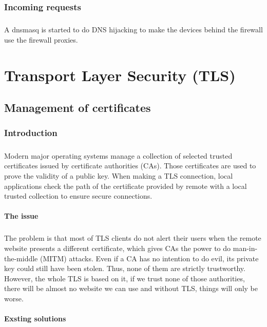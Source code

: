 \documentclass[mscthesis]{usiinfthesis}
\begin{document}
\subsection{Incoming requests}
\paragraph{}
A dnsmasq is started to do DNS hijacking to make the devices behind the firewall use the firewall proxies.

\chapter{Transport Layer Security (TLS)}\label{cha:tls}

\section{Management of certificates}

\subsection{Introduction}
\paragraph{}
Modern major operating systems manage a collection of selected trusted certificates issued by certificate authorities (CAs). Those certificates are used to prove the validity of a public key. When making a TLS connection, local applications check the path of the certificate provided by remote with a local trusted collection to ensure secure connections.
\subsubsection{The issue}
\paragraph{}
The problem is that most of TLS clients do not alert their users when the remote website presents a different certificate, which gives CAs the power to do man-in-the-middle (MITM) attacks. Even if a CA has no intention to do evil, its private key could still have been stolen. Thus, none of them are strictly trustworthy. However, the whole TLS is based on it, if we trust none of those authorities, there will be almost no website we can use and without TLS, things will only be worse.
\subsubsection{Exsting solutions}
\end{document}
